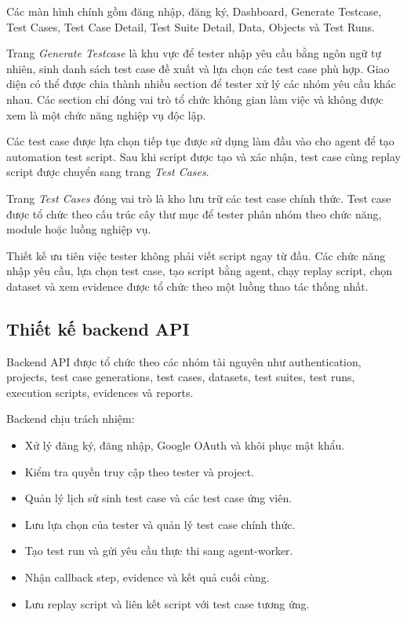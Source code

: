 Các màn hình chính gồm đăng nhập, đăng ký, Dashboard, Generate Testcase, Test Cases, Test Case Detail, Test Suite Detail, Data, Objects và Test Runs.

Trang \textit{Generate Testcase} là khu vực để tester nhập yêu cầu bằng ngôn ngữ tự nhiên, sinh danh sách test case đề xuất và lựa chọn các test case phù hợp. Giao diện có thể được chia thành nhiều section để tester xử lý các nhóm yêu cầu khác nhau. Các section chỉ đóng vai trò tổ chức không gian làm việc và không được xem là một chức năng nghiệp vụ độc lập.

Các test case được lựa chọn tiếp tục được sử dụng làm đầu vào cho agent để tạo automation test script. Sau khi script được tạo và xác nhận, test case cùng replay script được chuyển sang trang \textit{Test Cases}.

Trang \textit{Test Cases} đóng vai trò là kho lưu trữ các test case chính thức. Test case được tổ chức theo cấu trúc cây thư mục để tester phân nhóm theo chức năng, module hoặc luồng nghiệp vụ.

Thiết kế ưu tiên việc tester không phải viết script ngay từ đầu. Các chức năng nhập yêu cầu, lựa chọn test case, tạo script bằng agent, chạy replay script, chọn dataset và xem evidence được tổ chức theo một luồng thao tác thống nhất.

\subsection{Thiết kế backend API}

Backend API được tổ chức theo các nhóm tài nguyên như authentication, projects, test case generations, test cases, datasets, test suites, test runs, execution scripts, evidences và reports.

Backend chịu trách nhiệm:

\begin{itemize}
    \item Xử lý đăng ký, đăng nhập, Google OAuth và khôi phục mật khẩu.
    
    \item Kiểm tra quyền truy cập theo tester và project.
    
    \item Quản lý lịch sử sinh test case và các test case ứng viên.
    
    \item Lưu lựa chọn của tester và quản lý test case chính thức.
    
    \item Tạo test run và gửi yêu cầu thực thi sang agent-worker.
    
    \item Nhận callback step, evidence và kết quả cuối cùng.
    
    \item Lưu replay script và liên kết script với test case tương ứng.
\end{itemize}

